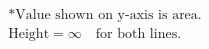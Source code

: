 \documentclass[preview]{standalone}
\begin{document}
\begin{align*}
\textrm{*Value shown on y-axis is area.} \\ \textrm{Height}=\infty \quad \textrm{for both lines.}
\end{align*}
\end{document}
